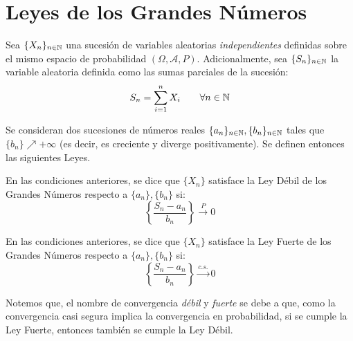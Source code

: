 \section{Leyes de los Grandes Números}

Sea $\{X_n\}_{n\in \mathbb{N}}$ una sucesión de variables aleatorias \emph{independientes} definidas sobre el mismo espacio de probabilidad $(\Omega, \mathcal{A}, P)$. Adicionalmente, sea $\{S_n\}_{n\in \mathbb{N}}$ la variable aleatoria definida como las sumas parciales de la sucesión:
\begin{equation*}
    S_n = \sum_{i=1}^{n} X_i\qquad \forall n\in \mathbb{N}
\end{equation*}

Se consideran dos sucesiones de números reales $\{a_n\}_{n\in \mathbb{N}}, \{b_n\}_{n\in \mathbb{N}}$ tales que $\{b_n\}\nearrow
+\infty$ (es decir, es creciente y diverge positivamente). Se definen entonces las siguientes Leyes.
\begin{definicion}
    En las condiciones anteriores, se dice que $\{X_n\}$ satisface la Ley Débil de los Grandes Números respecto a $\{a_n\}, \{b_n\}$ si:
    \begin{equation*}
        \left\{\frac{S_n - a_n}{b_n}\right\} \xrightarrow{P} 0
    \end{equation*}
\end{definicion}

\begin{definicion}
    En las condiciones anteriores, se dice que $\{X_n\}$ satisface la Ley Fuerte de los Grandes Números respecto a $\{a_n\}, \{b_n\}$ si:
    \begin{equation*}
        \left\{\frac{S_n - a_n}{b_n}\right\} \xrightarrow{c.s.} 0
    \end{equation*}
\end{definicion}

Notemos que, el nombre de convergencia \emph{débil} y \emph{fuerte} se debe a que, como la convergencia casi segura implica la convergencia en probabilidad, si se cumple la Ley Fuerte, entonces también se cumple la Ley Débil.\\

